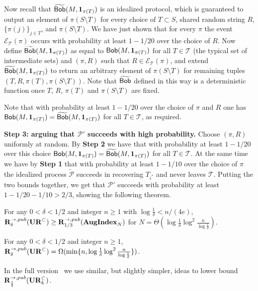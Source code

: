 Now recall that $\widetilde{\mathsf{Bob}}(M, \mathbf{1}_{\pi(T)})$ is an idealized protocol, which is guaranteed to output an element of $\pi(S\setminus T)$ for every choice of  $T\subset S$, shared random string $R$, $\{\pi(j)\}_{j\in T}$, and $\pi(S\setminus T)$. We have just shown that for every $\pi$ the event ${\mathcal E_{\mathcal T}(\pi)}$ occurs  with probability at least $1-1/20$ over the choice of $R$. Now define $\widetilde{\mathsf{Bob}}(M, \mathbf{1}_{\pi(T)})$ as equal to $\mathsf{Bob}(M, \mathbf{1}_{\pi(T)})$ for all $T\in \mathcal{T}$ (the typical set of intermediate sets) and $(\pi, R)$ such that $R\in {\mathcal E_{\mathcal T}(\pi)}$, and extend $\widetilde{\mathsf{Bob}}(M, \mathbf{1}_{\pi(T)})$ to return an arbitrary element of $\pi(S\setminus T)$ for remaining tuples $(T, R, \pi(T),  \pi(S\setminus T))$. Note that $\widetilde{\mathsf{Bob}}$ defined in this way is a deterministic function once $T$, $R$, $\pi(T)$ and $\pi(S\setminus T)$ are fixed. 

Note that with probability at least $1-1/20$ over the choice of $\pi$ and $R$ one has $\mathsf{Bob}(M, \mathbf{1}_{\pi(T)})=\widetilde{\mathsf{Bob}}(M, \mathbf{1}_{\pi(T)})$ for all $T\in \mathcal{T}$, as required.


{\bf Step 3: arguing that $\mathcal{P}'$ succeeds with high probability.}  Choose $(\pi, R)$ uniformly at random. By {\bf Step 2} we have that with probability at least $1-1/20$ over this choice 
$\mathsf{Bob}(M, \mathbf{1}_{\pi(T)})=\widetilde{\mathsf{Bob}}(M, \mathbf{1}_{\pi(T)})$ for all $T\in \mathcal{T}$. At the same time we have by {\bf Step 1} that with probability at least $1-1/10$ over the choice of $\pi$ the idealized process $\widetilde{\mathcal{P}}$ 
succeeds in recovering $T_{i^*}$ and never leaves $\mathcal{T}$. Putting the two bounds together, we get that $\mathcal{P}'$ succeeds with probability at least $1-1/20-1/10>2/3$, showing the following theorem.


\begin{theorem}
For any $0<\delta<1/2$ and integer $n\ge 1$ with $\log \frac 1{\delta} < n/(4e)$, $\mathbf{R}^{\rightarrow,pub}_\delta(\mathbf{UR}^\subset) \ge \mathbf{R}^{\rightarrow,pub}_{1/3}(\mathbf{AugIndex}_N)$ for $N = \Theta(\log\frac 1{\delta} \log^2 \frac n{\log \frac 1{\delta}})$.
\end{theorem}

\begin{corollary}
For any $0<\delta<1/2$ and integer $n\ge 1$, $\mathbf{R}^{\rightarrow,pub}_\delta(\mathbf{UR}^\subset) = \Omega(\min\{n, \log\frac 1{\delta} \log^2 \frac n{\log \frac 1{\delta}}\})$.
\end{corollary}


In the full version~\cite{KapralovNPWWY17} we use similar, but slightly simpler, ideas to lower bound $\mathbf{R}^{\rightarrow,pub}_{\frac 15}(\mathbf{UR}_k^\subset)$. 
